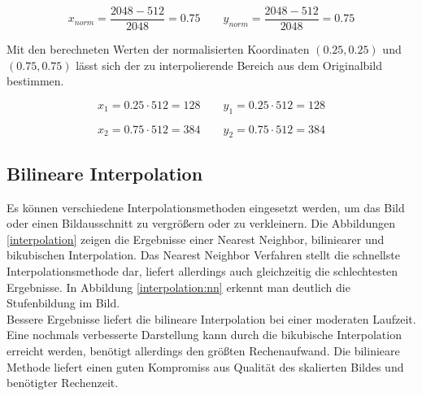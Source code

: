 \begin{equation}
 x_{norm} = \frac{2048 - 512}{2048} = 0.75\qquad
 y_{norm} = \frac{2048 - 512}{2048} = 0.75
\end{equation}

Mit den berechneten Werten der normalisierten Koordinaten $(0.25, 0.25)$ und $(0.75, 0.75)$ lässt sich der zu interpolierende Bereich aus dem Originalbild bestimmen.

\begin{equation}
 x_1 = 0.25 \cdot 512 =  128\qquad
 y_1 = 0.25 \cdot 512 =  128
\end{equation}

\begin{equation}
 x_2 = 0.75 \cdot 512 =  384\qquad
 y_2 = 0.75 \cdot 512 =  384
\end{equation}

\subsection{Bilineare Interpolation}

Es können verschiedene Interpolationsmethoden eingesetzt werden, um das Bild oder einen Bildausschnitt zu vergrößern oder zu verkleinern. Die Abbildungen \ref{interpolation} zeigen die Ergebnisse einer Nearest Neighbor, biliniearer und bikubischen Interpolation. Das Nearest Neighbor Verfahren stellt die schnellste Interpolationsmethode dar, liefert allerdings auch gleichzeitig die schlechtesten Ergebnisse. In Abbildung \ref{interpolation:nn} erkennt man deutlich die Stufenbildung im Bild.\\
Bessere Ergebnisse liefert die bilineare Interpolation bei einer moderaten Laufzeit. Eine nochmals verbesserte Darstellung kann durch die bikubische Interpolation erreicht werden, benötigt allerdings den größten Rechenaufwand. Die bilinieare Methode liefert einen guten Kompromiss aus Qualität des skalierten Bildes und benötigter Rechenzeit.

